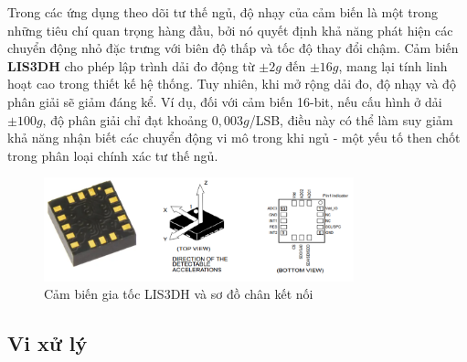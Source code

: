 Trong các ứng dụng theo dõi tư thế ngủ, độ nhạy của cảm biến là một 
trong những tiêu chí quan trọng hàng đầu, bởi nó quyết định khả năng 
phát hiện các chuyển động nhỏ đặc trưng với biên độ thấp và tốc độ 
thay đổi chậm. Cảm biến \textbf{LIS3DH} cho phép lập trình dải đo động 
từ $\pm2g$ đến $\pm16g$, mang lại tính linh hoạt cao trong thiết kế hệ 
thống. Tuy nhiên, khi mở rộng dải đo, độ nhạy và độ phân giải sẽ giảm 
đáng kể. Ví dụ, đối với cảm biến 16-bit, nếu cấu hình ở dải $\pm100g$, 
độ phân giải chỉ đạt khoảng $0{,}003g$/LSB, điều này có thể làm suy giảm 
khả năng nhận biết các chuyển động vi mô trong khi ngủ - một yếu tố 
then chốt trong phân loại chính xác tư thế ngủ.




\begin{figure}[!ht]
		\centering
 		\includegraphics[width=0.8\textwidth]{images/lis.png}
		\caption{Cảm biến gia tốc LIS3DH và sơ đồ chân kết nối}
		\label{lis}
\end{figure}




\subsection{Vi xử lý}

